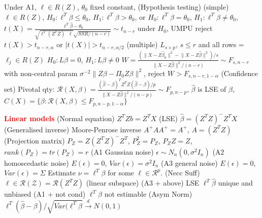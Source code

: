 \documentclass{article}
\renewcommand{\section}[1]{\textcolor{red}{\textbf{#1}}}
\renewcommand{\subsection}[1]{\text{\hl{[#1]}}}
\newcommand{\compact}{\nolinebreak}
\begin{document}
\subsection{Testing}
Under A1, $\ell \in R(Z)$, $\theta_0$ fixed constant,
(Hypothesis testing)
(simple)
$\ell \in R(Z)$,
$H_0: \ell^T\beta \leq \theta_0$, $H_1: \ell^T\beta > \theta_0$,
or $H_0: \ell^T\beta = \theta_0$, $H_1: \ell^T\beta \neq \theta_0$,
$
    t(X) = \frac{\ell^T\hat\beta - \theta_0}{
        \sqrt{ \ell^T(Z^TZ)^-\ell }
        \sqrt{ SSR/(n-r) }
    } \sim t_{n-r}
$ under $H_0$,
UMPU reject $t(X) > t_{n-r, \alpha}$
or $|t(X)| > t_{n-r, \alpha/2}$
(multiple)
$L_{s\times p}$, $s \leq r$ and all rows = $\ell_j \in R(Z)$
$H_0: L\beta = 0$, $H_1: L\beta \neq 0$
$
    W = \frac{(\lVert X - Z\hat\beta_0 \rVert^2 - \lVert X - Z\hat\beta
        \rVert^2)/s}{\lVert X - Z\hat\beta \rVert^2/(n-r)} \sim F_{s, n-r}
        {}
$
with non-central param
$\sigma^{-2}\lVert Z\beta - \Pi_0Z\beta\rVert^2$,
reject $W > F_{s, n-r, 1-\alpha}$
(Confidence set)
Pivotal qty: $
    \mathcal{R}(X, \beta) = \frac{(\hat\beta -
        \beta)^TZ^TZ(\hat\beta-\beta)/p}{
        \lVert X - Z\hat\beta \rVert^2/(n-p)
    } \sim F_{p, n-p}
$, $\hat\beta$ is LSE of $\beta$,
$C(X) = \{\beta: \mathcal{R}(X, \beta) \leq F_{p, n-p, 1-\alpha}\}$

\section{Linear models}
 (Normal equation) $Z^TZb = Z^TX$
(LSE) $\hat\beta = (Z^TZ)^- Z^T X$
(Generalised inverse) Moore-Penrose inverse $A^+ A A^+ = A^+$, $A = (Z^TZ)$
(Projection matrix) $P_Z = Z(Z^TZ)^- Z^T$, $P_Z^2 = P_Z$, $P_Z Z = Z$,
$rank(P_Z)=tr(P_Z)=r$
\compact
\subsection{Assumptions}
(A1 Gaussian noise) $\epsilon\sim N_n(0, \sigma^2 I_n)$
(A2 homoscedastic noise) $E(\epsilon) =0$, $Var(\epsilon) = \sigma^2 I_n$
(A3 general noise) $E(\epsilon) = 0$, $Var(\epsilon) = \Sigma$
\compact
\subsection{Estimable}
Estimate $\nu = \ell^T \beta$ for some $\ell\in\mathcal{R}^p$.
(Necc Suff) $\ell \in \mathcal{R(Z)} = \mathcal{R}(Z^TZ)$ (linear subspace)
(A3 + above)  LSE $\ell^T\hat\beta$ unique and unbiased
(A1 + not cond) $\ell^T\beta$ not estimable
\compact
\subsection{asym}
(Asym Norm) $\ell^T(\hat\beta - \beta)/\sqrt{Var(\ell^T\hat\beta}
    \xrightarrow{d} N(0, 1)$
\compact
\end{document}
